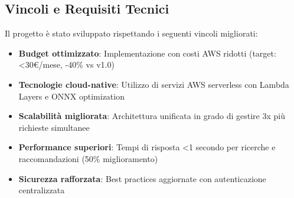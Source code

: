 \documentclass[11pt,a4paper]{article}
\begin{document}
\subsection{Vincoli e Requisiti Tecnici}
Il progetto è stato sviluppato rispettando i seguenti vincoli migliorati:
\begin{itemize}
  \item \textbf{Budget ottimizzato}: Implementazione con costi AWS ridotti (target: <30€/mese, -40\% vs v1.0)
  \item \textbf{Tecnologie cloud-native}: Utilizzo di servizi AWS serverless con Lambda Layers e ONNX optimization
  \item \textbf{Scalabilità migliorata}: Architettura unificata in grado di gestire 3x più richieste simultanee
  \item \textbf{Performance superiori}: Tempi di risposta <1 secondo per ricerche e raccomandazioni (50\% miglioramento)
  \item \textbf{Sicurezza rafforzata}: Best practices aggiornate con autenticazione centralizzata
\end{itemize}
\end{document}

